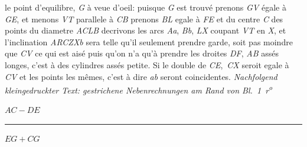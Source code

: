 le point d'equilibre, 
\textit{G} à veue d'oeil: puisque \textit{G} est trouvé prenons \textit{GV} égale à \textit{GE}, et menons \textit{VT} parallele à 
\textit{CB} prenons \textit{BL} egale à \textit{FE} et du centre \textit{C} des points du diametre \textit{ACLB} decrivons les arcs \textit{Aa}, \textit{Bb}, \textit{LX} coupant \textit{VT} en \textit{X}, et l'inclination \textit{ARCZXb} sera telle qu'il 
seulement prendre garde, 
soit pas moindre que \textit{CV} ce qui est aisé puis qu'on n'a qu'à prendre les droites \textit{DF}, \textit{AB} assés longes, c'est à 
des cylindres assés petite. Si 
le double de \textit{CE}\lbrack,\rbrack\ \textit{CX} seroit egale à \textit{CV} et les points 
les mêmes, c'est à dire \textit{ab} 
seront coincidentes. 
\pend
{}
\vspace{0.5em} %
\pstart
\noindent
\lbrack\textit{Nachfolgend kleingedruckter Text: gestrichene Nebenrechnungen am Rand von Bl.~1~r\textsuperscript{o}}\rbrack %
\pend
\nobreak
\vspace{0.5em}
\footnotesize
\pstart
\parbox{4cm}{$AC-DE$\rule[0mm]{3mm}{0pt}$EG+CG$
\\[1ex]
\hspace*{1mm}\hspace*{7mm}}
